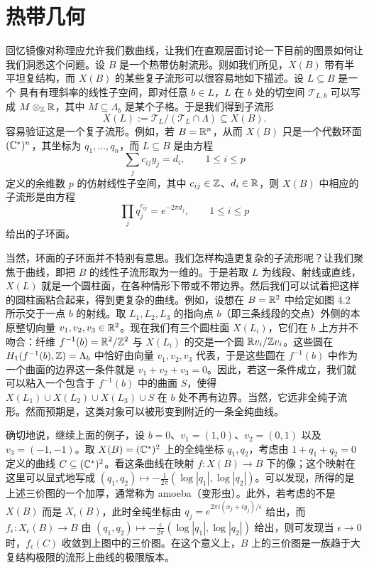 \section{热带几何}
回忆镜像对称理应允许我们数曲线，让我们在直观层面讨论一下目前的图景如何让我们洞悉这个问题。设 $B$ 是一个热带仿射流形。则如我们所见，$X(B)$ 带有半平坦复结构，而 $X(B)$ 的某些复子流形可以很容易地如下描述。设 $L\subseteq B$ 是一个
具有有理斜率的线性子空间，即对任意 $b\in L$，$L$ 在 $b$ 处的切空间 $\mathcal{T}_{L,b}$ 可以写成 $M\otimes_{\mathbb{Z}}\mathbb{R}$，其中 $M\subseteq\Lambda_b$ 是某个子格。于是我们得到子流形
\[
X(L):=\mathcal{T}_L/(\mathcal{T}_L\cap\Lambda)\subseteq X(B).
\]
容易验证这是一个复子流形。例如，若 $B=\mathbb{R}^n$，从而 $X(B)$ 只是一个代数环面 $(\mathbb{C}^*)^n$，其坐标为 $q_1,\dots,q_n$，而 $L\subseteq B$ 是由方程
\[
\sum_j c_{ij}y_j=d_i,\qquad 1\le i\le p
\]
定义的余维数 $p$ 的仿射线性子空间，其中 $c_{ij}\in\mathbb{Z}$、$d_i\in\mathbb{R}$，则 $X(B)$ 中相应的子流形是由方程
\[
\prod_j q_j^{c_{ij}}=e^{-2\pi d_j},\qquad 1\le i\le p
\]
给出的子环面。

当然，环面的子环面并不特别有意思。我们怎样构造更复杂的子流形呢？让我们聚焦于曲线，即把 $B$ 的线性子流形取为一维的。于是若取 $L$ 为线段、射线或直线，$X(L)$ 就是一个圆柱面，在各种情形下带或不带边界。然后我们可以试着把这样的圆柱面粘合起来，得到更复杂的曲线。例如，设想在 $B=\mathbb{R}^2$ 中给定如图 4.2 所示交于一点 $b$ 的射线。取 $L_1,L_2,L_3$ 的指向点 $b$（即三条线段的交点）外侧的本原整切向量 $v_1,v_2,v_3\in\mathbb{R}^2$。现在我们有三个圆柱面 $X(L_i)$，它们在 $b$ 上方并不吻合：纤维 $f^{-1}(b)=\mathbb{R}^2/\mathbb{Z}^2$ 与 $X(L_i)$ 的交是一个圆 $\mathbb{R} v_i/\mathbb{Z} v_i$。这些圆在 $H_1(f^{-1}(b),\mathbb{Z})=\Lambda_b$ 中恰好由向量 $v_1,v_2,v_3$ 代表，于是这些圆在 $f^{-1}(b)$ 中作为一个曲面的边界这一条件就是 $v_1+v_2+v_3=0$。因此，若这一条件成立，我们就可以粘入一个包含于 $f^{-1}(b)$ 中的曲面 $S$，使得 $X(L_1)\cup X(L_2)\cup X(L_3)\cup S$ 在 $b$ 处不再有边界。当然，它远非全纯子流形。然而预期是，这类对象可以被形变到附近的一条全纯曲线。

确切地说，继续上面的例子，设 $b=0$、$v_1=(1,0)$、$v_2=(0,1)$ 以及 $v_3=(-1,-1)$。取 $X(B)=(\mathbb{C}^*)^2$ 上的全纯坐标 $q_1,q_2$，考虑由 $1+q_1+q_2=0$ 定义的曲线 $C\subseteq(\mathbb{C}^*)^2$。看这条曲线在映射 $f:X(B)\to B$ 下的像；这个映射在这里可以显式地写成 $(q_1,q_2)\mapsto-\frac{1}{2\pi}(\log|q_1|,\log|q_2|)$。可以发现，所得的是上述三价图的一个加厚，通常称为 amoeba（变形虫）。此外，若考虑的不是 $X(B)$ 而是 $X_\epsilon(B)$，此时全纯坐标由 $q_j=e^{2\pi i(x_j+iy_j)/\epsilon}$ 给出，而 $f_\epsilon:X_\epsilon(B)\to B$ 由 $(q_1,q_2)\mapsto-\frac{\epsilon}{2\pi}(\log|q_1|,\log|q_2|)$ 给出，则可发现当 $\epsilon\to0$ 时，$f_\epsilon(C)$ 收敛到上图中的三价图。在这个意义上，$B$ 上的三价图是一族趋于大复结构极限的流形上曲线的极限版本。

